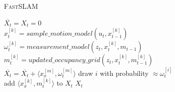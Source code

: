 \documentclass[11pt]{article}
\begin{document}
\IncMargin{1.5em}
\begin{algorithm}[H]
    \caption{\textsc{Fast}SLAM\label{alg:FSM}}
    \Indm
    \Indp
    $\overline{X_t} = X_t = 0$\\
    {$x^{[k]}_t= sample\_motion\_model(u_t,x^{[k]}_{t-1})$\\
    $\omega^{[k]}_t= measurement\_model(z_t,x^{[k]}_t,m_{t-1})$\\
    $m^{[k]}_t= updated\_occupancy\_grid(z_t,x^{[k]}_t, m^{[k]}_{t-1})$\\
    $\overline{X_t}=\overline{X_t}+\langle x^{[m]}_x,\omega^{[m]}_t\rangle$
    }
    {
    draw $i$ with probability $\approx \omega^{[i]}_t$\\
    add $\langle x^{[k]}_x, m^{[k]}_t \rangle$ to $X_t$
    }
    \Return $X_t$\\
\end{algorithm}
\end{document}
